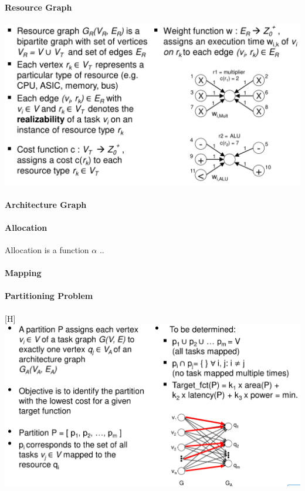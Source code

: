 \documentclass[english]{latex4ei/latex4ei_sheet}
\begin{document}
\paragraph{Resource Graph}

\begin{center}
  \includegraphics[width=\linewidth]{assets/ResourceGraph.png}
  \label{fig:resourcegraph}
\end{center}

\paragraph{Architecture Graph}

\paragraph{Allocation} Allocation is a function $\alpha$ ..

\paragraph{Mapping}

\paragraph{Partitioning Problem}

\begin{center}[H]
  \centering
  \includegraphics[width=\linewidth]{assets/PartitioningProblem.png}
  \label{fig:partitioningproblem}
\end{center}
\end{document}
